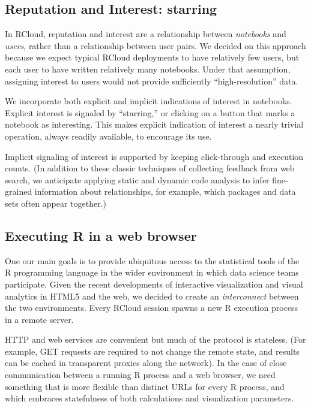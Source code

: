 \subsection{Reputation and Interest: starring\label{sec:starring}}

In RCloud, reputation and interest are a relationship between
\emph{notebooks} and \emph{users}, rather than a relationship between
user pairs. We decided on this approach because we expect typical
RCloud deployments to have relatively few users, but each user to have
written relatively many notebooks. Under that assumption, assigning
interest to users would not provide sufficiently ``high-resolution'' data.

We incorporate both explicit and implicit indications of interest
in notebooks. Explicit interest is signaled by ``starring,'' or
clicking on a button that marks a notebook as interesting.
This makes explicit indication of interest a nearly trivial operation,
always readily available, to encourage its use.

Implicit signaling of interest is supported by keeping click-through
\cite{Joachims:2005:AIC} and execution counts. (In addition to these
classic techniques of collecting feedback from web search, we anticipate
applying static and dynamic code analysis to infer fine-grained
information about relationships, for example, which packages and data
sets often appear together.)

\subsection{Executing R in a web browser\label{sec:executinginbrowser}}

One our main goals is to provide ubiquitous access to the statistical
tools of the R programming language in the wider environment in which data
science teams participate.
%
Given the recent developments of interactive visualization and visual
analytics in HTML5 and the web, we decided to create an
\emph{interconnect} between the two environments.
%
Every RCloud session spawns a new R execution process in a remote
server.


HTTP and web services are convenient but much of the protocol is
stateless. (For example, GET requests are required to not change the
remote state, and results can be cached in transparent proxies along
the network). In the case of close communication between a running
R process and a web browser, we need something that is more flexible
than distinct URLs for every R process, and which embraces
statefulness of both calculations and visualization parameters.

